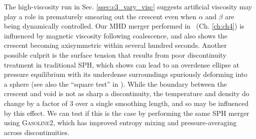 The high-viscosity run in Sec. \ref{ssec:c3_vary_visc} suggests artificial viscosity may play a role in prematurely smearing out the crescent even when $\alpha$ and $\beta$ are being dynamically controlled.  Our MHD merger performed in \arepo\ (Ch. \ref{ch:ch4}) is influenced by magnetic viscosity following coalescence, and also shows the crescent becoming axisymmetric within several hundred seconds.  Another possible culprit is the surface tension that results from poor discontinuity treatment in traditional SPH, which \cite{hesss10} shows can lead to an overdense ellipse at pressure equilibrium with its underdense surroundings spuriously deforming into a sphere {\charles (see also the ``square test'' in \cite{hopk15})}.  While the boundary between the crescent and void is not as sharp a discontinuity, the temperature and density do change by a factor of $3$ over a single smoothing length, and so may be influenced by this effect.  We can test if this is the case by performing the same SPH merger using \textsc{Gasoline2}, which has improved entropy mixing and pressure-averaging across discontinuities.



